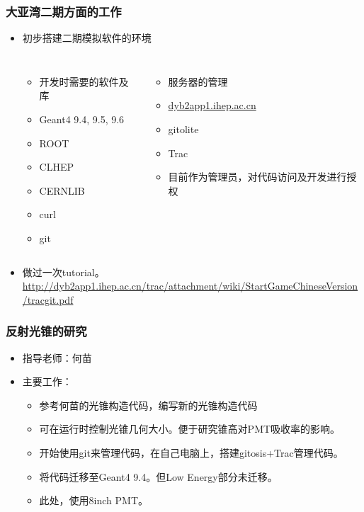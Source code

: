 \begin{frame}
    \frametitle{大亚湾二期方面的工作}
    \begin{itemize}
        \item 初步搭建二期模拟软件的环境
            \begin{columns}
                \column{4.0cm}
                    \begin{itemize}
                        \item 开发时需要的软件及库
                        \item Geant4 9.4, 9.5, 9.6
                        \item ROOT
                        \item CLHEP
                        \item CERNLIB
                        \item curl
                        \item git
                    \end{itemize}
                \column{6.0cm}
                    \begin{itemize}
                        \item 服务器的管理
                        \item \url{dyb2app1.ihep.ac.cn}
                        \item gitolite
                        \item Trac
                        \item 目前作为管理员，对代码访问及开发进行授权
                    \end{itemize}
            \end{columns}
        \item 做过一次tutorial。\url{http://dyb2app1.ihep.ac.cn/trac/attachment/wiki/StartGameChineseVersion/tracgit.pdf}
    \end{itemize}
\end{frame}

\begin{frame}
    \frametitle{反射光锥的研究}
    \begin{itemize}
        \item 指导老师：何苗
        \item 主要工作：
            \begin{itemize}
                \item 参考何苗的光锥构造代码，编写新的光锥构造代码
                \item 可在运行时控制光锥几何大小。便于研究锥高对PMT吸收率的影响。
                \item 开始使用git来管理代码，在自己电脑上，搭建gitosis+Trac管理代码。
                \item 将代码迁移至Geant4 9.4。但Low Energy部分未迁移。
                \item 此处，使用8inch PMT。
            \end{itemize}
    \end{itemize}
\end{frame}

